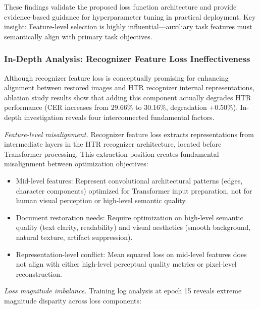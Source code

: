 \documentclass[journal]{IEEEtran}
\begin{document}
These findings validate the proposed loss function architecture and provide evidence-based guidance for hyperparameter tuning in practical deployment. Key insight: Feature-level selection is highly influential—auxiliary task features must semantically align with primary task objectives.

\subsubsection{In-Depth Analysis: Recognizer Feature Loss Ineffectiveness}
\label{sec:recfeat_analysis}

Although recognizer feature loss is conceptually promising for enhancing alignment between restored images and HTR recognizer internal representations, ablation study results show that adding this component actually degrades HTR performance (CER increases from 29.66\% to 30.16\%, degradation +0.50\%). In-depth investigation reveals four interconnected fundamental factors.

\textit{Feature-level misalignment.} Recognizer feature loss extracts representations from intermediate layers in the HTR recognizer architecture, located before Transformer processing. This extraction position creates fundamental misalignment between optimization objectives:

\begin{itemize}
    \item Mid-level features: Represent convolutional architectural patterns (edges, character components) optimized for Transformer input preparation, not for human visual perception or high-level semantic quality.
    
    \item Document restoration needs: Require optimization on high-level semantic quality (text clarity, readability) and visual aesthetics (smooth background, natural texture, artifact suppression).
    
    \item Representation-level conflict: Mean squared loss on mid-level features does not align with either high-level perceptual quality metrics or pixel-level reconstruction.
\end{itemize}

\textit{Loss magnitude imbalance.} Training log analysis at epoch 15 reveals extreme magnitude disparity across loss components:
\end{document}
